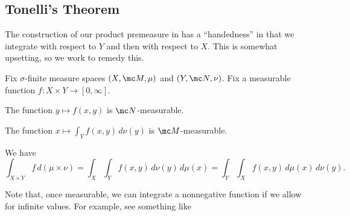 \documentclass[../notes.tex]{subfiles}
\begin{document}
\subsection{Tonelli's Theorem}
The construction of our product premeasure in  has a ``handedness'' in that we integrate with respect to $Y$ and then with respect to $X$. This is somewhat upsetting, so we work to remedy this.
\begin{theorem}[Tonelli] \label{thm:tonelli}
	Fix $\sigma$-finite measure spaces $(X,\mc M,\mu)$ and $(Y,\mc N,\nu)$. Fix a measurable function $f\colon X\times Y\to[0,\infty]$.
	\begin{listalph}
		\item The function $y\mapsto f(x,y)$ is $\mc N$-measurable.
		\item The function $x\mapsto\int_Yf(x,y)\,d\nu(y)$ is $\mc M$-measurable.
		\item We have
		\[\int_{X\times Y}f\,d(\mu\times\nu)=\int_X\int_Yf(x,y)\,d\nu(y)\,d\mu(x)=\int_Y\int_Xf(x,y)\,d\mu(x)\,d\nu(y).\]
	\end{listalph}
\end{theorem}
\begin{remark}
	Note that, once measurable, we can integrate a nonnegative function if we allow for infinite values. For example, see something like \cite[Proposition~9.22]{elber-top}
\end{remark}
\end{document}

